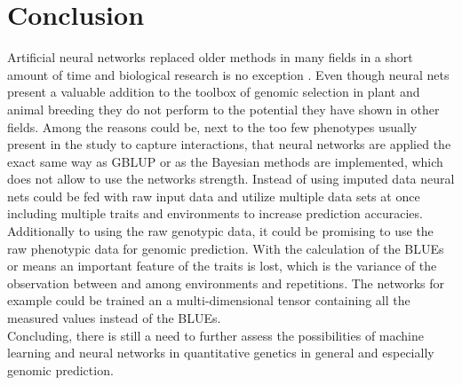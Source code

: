 \section{Conclusion}
Artificial neural networks replaced older methods in many fields in a short amount of time
and biological research is no exception \cite{angermueller2016}. Even though neural nets
present a valuable addition to the toolbox of genomic selection in plant and animal
breeding they do not perform to the potential they have shown in other fields.  Among the
reasons could be, next to the too few phenotypes usually present in the study to capture
interactions, that neural networks are applied the exact same way as GBLUP or as the
Bayesian methods are implemented, which does not allow to use the networks
strength. Instead of using imputed data neural nets could be fed with raw input data and
utilize multiple data sets at once including multiple traits and environments to increase
prediction accuracies. Additionally to using the raw genotypic data, it could be promising
to use the raw phenotypic data for genomic prediction. With the calculation of the BLUEs
or means an important feature of the traits is lost, which is the variance of the
observation between and among environments and repetitions. The networks for example could
be trained an a multi-dimensional tensor containing all the measured values instead of the BLUEs. \\
Concluding, there is still a need to further assess the possibilities of machine learning
and neural networks in quantitative genetics in general and especially genomic prediction.



